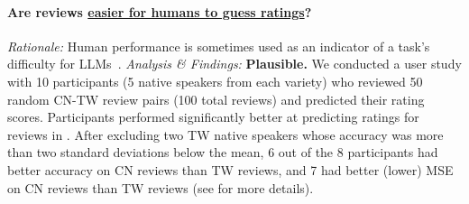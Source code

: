 \paragraph{Are \cnChinese reviews \ul{easier for humans to guess ratings}?}
\textit{Rationale:} Human performance is sometimes used as an indicator of a task's difficulty for LLMs~\cite{sakamoto-etal-2025-development,ding2024easyhardbench}.
\textit{Analysis \& Findings:}
\textbf{Plausible.}
We conducted a user study with 10 participants (5 native speakers from each variety) who reviewed 50 random CN-TW review pairs (100 total reviews) and predicted their rating scores.
Participants performed significantly better at predicting ratings for reviews in \cnChinese.
After excluding two TW native speakers whose accuracy was more than two standard deviations below the mean, 6 out of the 8 participants had better accuracy on CN reviews than TW reviews, and 7 had better (lower) MSE on CN reviews than TW reviews (see  for more details).

